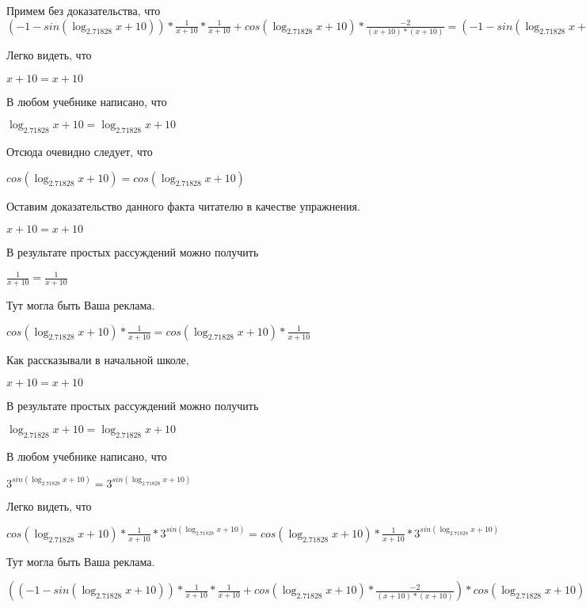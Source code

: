 \documentclass[12pt,a4paper,fleqn]{article}
\theoremstyle{definition}
\begin{document}
Примем без доказательства, что
$( -1  - sin(\log_{ 2.71828 }{ x  +  10 })) * \frac{ 1 }{ x  +  10 }
 * \frac{ 1 }{ x  +  10 }
 + cos(\log_{ 2.71828 }{ x  +  10 }) * \frac{ -2 }{( x  +  10 ) * ( x  +  10 )}
 = ( -1  - sin(\log_{ 2.71828 }{ x  +  10 })) * \frac{ 1 }{ x  +  10 }
 * \frac{ 1 }{ x  +  10 }
 + cos(\log_{ 2.71828 }{ x  +  10 }) * \frac{ -2 }{( x  +  10 ) * ( x  +  10 )}
$

Легко видеть, что

$ x  +  10  =  x  +  10 $

В любом учебнике написано, что

$\log_{ 2.71828 }{ x  +  10 } = \log_{ 2.71828 }{ x  +  10 }$

Отсюда очевидно следует, что

$cos(\log_{ 2.71828 }{ x  +  10 }) = cos(\log_{ 2.71828 }{ x  +  10 })$

Оставим доказательство данного факта читателю в качестве упражнения.

$ x  +  10  =  x  +  10 $

В результате простых рассуждений можно получить

$\frac{ 1 }{ x  +  10 }
 = \frac{ 1 }{ x  +  10 }
$

Тут могла быть Ваша реклама.

$cos(\log_{ 2.71828 }{ x  +  10 }) * \frac{ 1 }{ x  +  10 }
 = cos(\log_{ 2.71828 }{ x  +  10 }) * \frac{ 1 }{ x  +  10 }
$

Как рассказывали в начальной школе,

$ x  +  10  =  x  +  10 $

В результате простых рассуждений можно получить

$\log_{ 2.71828 }{ x  +  10 } = \log_{ 2.71828 }{ x  +  10 }$

В любом учебнике написано, что

${ 3 }^{sin(\log_{ 2.71828 }{ x  +  10 })} = { 3 }^{sin(\log_{ 2.71828 }{ x  +  10 })}$

Легко видеть, что

$cos(\log_{ 2.71828 }{ x  +  10 }) * \frac{ 1 }{ x  +  10 }
 * { 3 }^{sin(\log_{ 2.71828 }{ x  +  10 })} = cos(\log_{ 2.71828 }{ x  +  10 }) * \frac{ 1 }{ x  +  10 }
 * { 3 }^{sin(\log_{ 2.71828 }{ x  +  10 })}$

Тут могла быть Ваша реклама.

$(( -1  - sin(\log_{ 2.71828 }{ x  +  10 })) * \frac{ 1 }{ x  +  10 }
 * \frac{ 1 }{ x  +  10 }
 + cos(\log_{ 2.71828 }{ x  +  10 }) * \frac{ -2 }{( x  +  10 ) * ( x  +  10 )}
) * cos(\log_{ 2.71828 }{ x  +  10 }) * \frac{ 1 }{ x  +  10 }
 * { 3 }^{sin(\log_{ 2.71828 }{ x  +  10 })} = (( -1  - sin(\log_{ 2.71828 }{ x  +  10 })) * \frac{ 1 }{ x  +  10 }
 * \frac{ 1 }{ x  +  10 }
 + cos(\log_{ 2.71828 }{ x  +  10 }) * \frac{ -2 }{( x  +  10 ) * ( x  +  10 )}
) * cos(\log_{ 2.71828 }{ x  +  10 }) * \frac{ 1 }{ x  +  10 }
 * { 3 }^{sin(\log_{ 2.71828 }{ x  +  10 })}$
\end{document}
